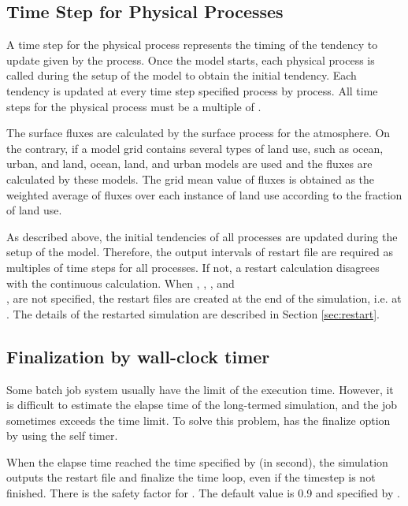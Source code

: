 \subsection{Time Step for Physical Processes}
A time step for the physical process represents the timing of the tendency to update given by the process. Once the model starts, each physical process is called during the setup of the model to obtain the initial tendency. Each tendency is updated at every time step specified process by process.
All time steps for the physical process must be a multiple of .

The surface fluxes are calculated by the surface process for the atmosphere.
On the contrary, if a model grid contains several types of land use, such as ocean, urban, and land,
ocean, land, and urban models are used and the fluxes are calculated by these models.
The grid mean value of fluxes is obtained as the weighted average of fluxes over each instance of land use according to the fraction of land use.

As described above, the initial tendencies of all processes are updated during the setup of the model.
Therefore, the output intervals of restart file are required as multiples of time steps for all processes.
If not, a restart calculation disagrees with the continuous calculation.
When , ,  , and\\ , are not specified,
the restart files are created at the end of the simulation, i.e. at .
The details of the restarted simulation are described in Section \ref{sec:restart}.

\subsection{Finalization by wall-clock timer} \label{subsec:wallclock_check}

Some batch job system usually have the limit of the execution time. However, it is difficult to estimate the elapse time of the long-termed simulation, and the job sometimes exceeds the time limit.
To solve this problem, \scalerm has the finalize option by using the self timer.

When the elapse time reached the time specified by  (in second), the simulation outputs the restart file and finalize the time loop, even if the timestep is not finished.
There is the safety factor for . The default value is 0.9 and specified by .


